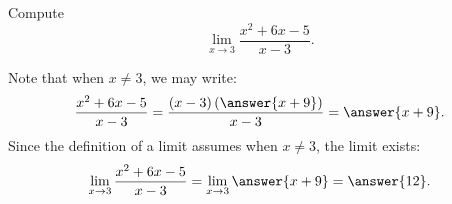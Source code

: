 \documentclass{ximera}
\begin{document}
\begin{example}
Compute 
\[
\lim_{x\to 3} \frac{x^2+6x-5}{x-3}.
\]
\begin{explanation}
Note that when $x \neq 3$, we may write:
\[
\frac{x^2+6x-5}{x-3} = \frac{(x-3)\left(\answer{x+9}\right)}{x-3} = \answer{x+9}.
\]
Since the definition of a limit assumes  when $x \neq 3$, the limit exists:
\[
\lim_{x \to 3} \frac{x^2+6x-5}{x-3} = \lim_{x \to 3} \answer{x+9} = \answer{12}.
\]
\end{explanation}
\end{example}
\end{document}

